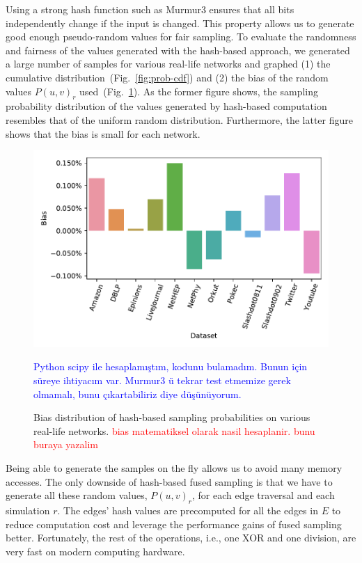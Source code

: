 \documentclass[10pt,journal,compsoc]{IEEEtran}
\newcommand\ggx[1]{\textcolor{blue}{#1}}
\newcommand\kktodo[1]{\textcolor{red}{#1}}
\begin{document}
Using a strong hash function such as {{\sc Murmur3}} ensures that all bits independently change if the input is changed. This property allows us to generate good enough pseudo-random values for fair sampling. To evaluate the randomness and fairness of the values generated with the hash-based approach, we generated a large number of samples for various real-life networks and graphed (1) the cumulative distribution~(Fig.~\ref{fig:prob-cdf}) and (2) the bias of the random values $P(u,v)_r$ used~(Fig.~\ref{fig:prob-bias}). As the former figure shows, the sampling probability distribution of the values generated by hash-based computation resembles that of the uniform random distribution. Furthermore, the latter figure shows that the bias is small for each network. 

\begin{figure}[!ht] 
    \centering
    \includegraphics[width=1\linewidth]{./images/bias.pdf}
    \caption{Bias distribution of hash-based sampling probabilities on various real-life networks. \kktodo{bias matematiksel olarak nasil hesaplanir. bunu buraya yazalim}}\ggx{Python scipy ile hesaplamıştım, kodunu bulamadım. Bunun için süreye ihtiyacım var. Murmur3 ü tekrar test etmemize gerek olmamalı, bunu çıkartabiliriz diye düşünüyorum. }
    \label{fig:prob-bias} 
\end{figure}

Being able to generate the samples on the fly allows us to avoid many memory accesses. The only downside of hash-based fused sampling is that we have to generate all these random values,   $P(u,v)_r$, for each edge traversal and each simulation $r$. The edges' hash values are precomputed for all the edges in $E$ to reduce computation cost and leverage the performance gains of fused sampling better. Fortunately, the rest of the operations, i.e., one XOR and one division, are very fast on modern computing hardware. %
\end{document}
